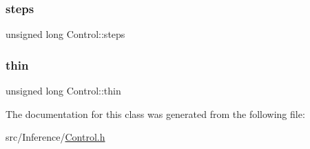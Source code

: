 \mbox{\label{struct_control_af4bd5a6c779079b5e921b4df40760266}} 
\subsubsection{\texorpdfstring{steps}{steps}}
{\footnotesize\ttfamily unsigned long Control\+::steps}

\mbox{\label{struct_control_a08030350e86fd21411599690892e31a8}} 
\subsubsection{\texorpdfstring{thin}{thin}}
{\footnotesize\ttfamily unsigned long Control\+::thin}



The documentation for this class was generated from the following file\+:\begin{DoxyCompactItemize}
\item 
src/\+Inference/\hyperlink{_control_8h}{Control.\+h}\end{DoxyCompactItemize}
